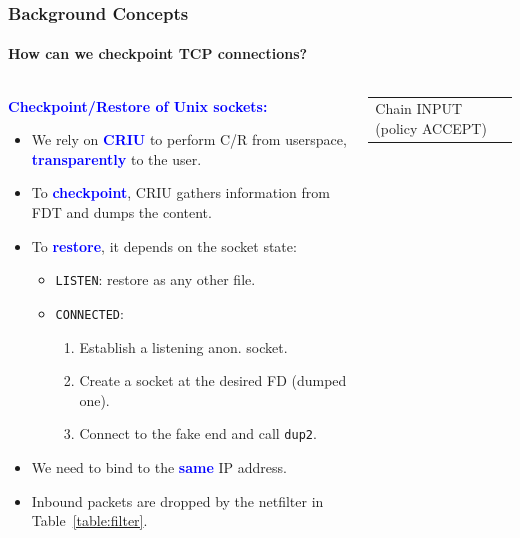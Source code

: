 \documentclass[9pt,    %
    english,            %
    xcolor=table,       %
    envcountsect,        %
    aspectratio=169     %
]{beamer}
\begin{document}
\begin{frame}
    \frametitle{Background Concepts}
    \framesubtitle{How can we checkpoint TCP connections?}

    \begin{columns}[t]
        \begin{column}{.65\textwidth}
            \textbf{\textcolor{blue}{Checkpoint/Restore of Unix sockets:}} 
            \begin{itemize}
                \item We rely on \textbf{\textcolor{blue}{CRIU}} to perform C/R from userspace, \textbf{\textcolor{blue}{transparently}} to the user.
                \item To \textbf{\textcolor{blue}{checkpoint}}, CRIU gathers information from FDT and dumps the content.
                \item To \textbf{\textcolor{blue}{restore}}, it depends on the socket state:
                \begin{itemize}
                    \item \texttt{LISTEN}: restore as any other file.
                    \item \texttt{CONNECTED}:
                    \begin{enumerate}
                        \item Establish a listening anon. socket.
                        \item Create a socket at the desired FD (dumped one).
                        \item Connect to the fake end and call \texttt{dup2}.
                    \end{enumerate}
                \end{itemize}
            \item We need to bind to the \textbf{\textcolor{blue}{same}} IP address.
            \item Inbound packets are dropped by the netfilter in Table~\ref{table:filter}.
            \end{itemize}
        \end{column}
        \begin{column}{.40\textwidth}
            \vspace{-18pt}
            \begin{table}
                \centering
                {\ttfamily \scriptsize
                \begin{tabular}{p{0.7cm}p{0.3cm}p{0.3cm}p{0.5cm}p{0.5cm}p{1.2cm}}
                    \multicolumn{6}{l}{Chain INPUT (policy ACCEPT)} \\

\end{tabular}}
\end{table}
\end{column}
\end{columns}
\end{frame}
\end{document}
